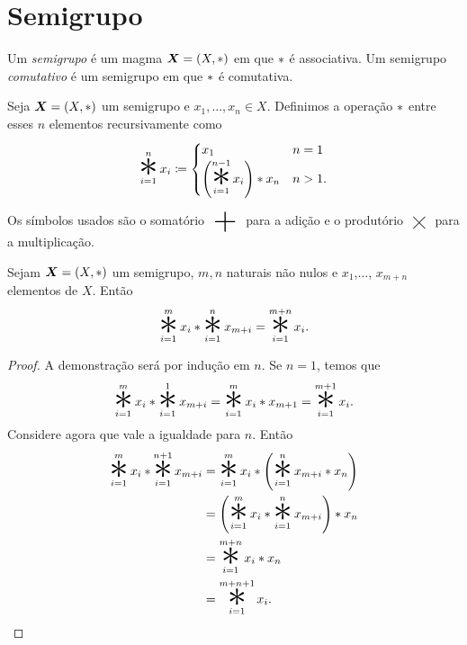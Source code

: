 \section{Semigrupo}

\begin{defi}
	Um \emph{semigrupo} é um magma $\bm X=(X, \ast )$ em que $ \ast $ é associativa. Um semigrupo \emph{comutativo} é um semigrupo em que $ \ast $ é comutativa.
\end{defi}

\begin{defi}
	Seja $\bm X=(X, \ast )$ um semigrupo e $x_1, \ldots, x_n \in X$. Definimos a operação $ \ast $ entre esses $n$ elementos recursivamente como
	\begin{equation*}
	\bigopb _{i=1}^n x_i \coloneqq
		\begin{cases}
		x_1 & n=1\\
		\left(\displaystyle\bigopb _{i=1}^{n-1} x_i\right) \opb x_n & n>1.
		\end{cases}
	\end{equation*}
\end{defi}

	Os símbolos usados são o somatório $\ \displaystyle\bigplus\ $ \index[simb]{$\displaystyle\bigplus$} para a adição e o produtório $\ \displaystyle\bigtimes\ $ \index[simb]{$\displaystyle\bigtimes$} para a multiplicação.

\begin{prop}
	Sejam $\bm X=(X, \ast )$ um semigrupo, $m,n$ naturais não nulos e $x_1$,$ \ldots$, $x_{m+n}$ elementos de $X$. Então
	\begin{equation*}
	\bigopb _{i=1}^m x_i  \opb  \bigopb _{i=1}^n x_{m+i} = \bigopb _{i=1}^{m+n} x_i.
	\end{equation*}
\end{prop}
\begin{proof}
	A demonstração será por indução em $n$. Se $n=1$, temos que
	\begin{equation*}
	\bigopb _{i=1}^m x_i  \opb  \bigopb _{i=1}^1 x_{m+i} = \bigopb _{i=1}^m x_i  \opb  x_{m+1} = \bigopb _{i=1}^{m+1} x_i.
	\end{equation*}
Considere agora que vale a igualdade para $n$. Então
	\begin{equation*}
	\begin{split}
	\bigopb _{i=1}^m x_i  \opb  \bigopb _{i=1}^{n+1} x_{m+i} &=  \bigopb _{i=1}^m x_i  \opb  \left( \bigopb _{i=1}^n x_{m+i}  \opb  x_n \right) \\
			&= \left( \bigopb _{i=1}^m x_i  \opb  \bigopb _{i=1}^n x_{m+i} \right)  \opb  x_n \\
			&= \bigopb _{i=1}^{m+n} x_i  \opb  x_n \\
			&= \bigopb _{i=1}^{m+n+1} x_i.
	\end{split}
	\end{equation*}
\end{proof}

